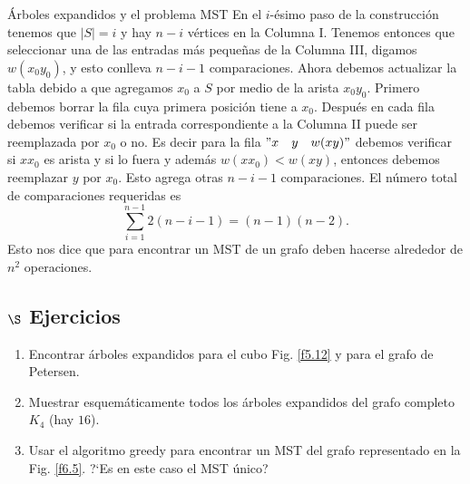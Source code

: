 \begin{section}{Árboles expandidos y el problema MST}
En el $i$-ésimo paso de la construcción tenemos que $|S|=i$ y hay
$n-i$ vértices en la Columna I. Tenemos entonces que seleccionar
una de las entradas más pequeñas de la Columna III, digamos
$w(x_0y_0)$, y esto conlleva $n-i-1$ comparaciones. Ahora debemos
actualizar la tabla debido a que agregamos $x_0$ a $S$ por medio
de la arista $x_0y_0$. Primero debemos borrar la fila cuya primera
posición tiene a $x_0$. Después en cada fila debemos verificar si
la entrada correspondiente a la Columna II puede ser reemplazada
por $x_0$ o no. Es decir para la fila $"x\quad y \quad w(xy)"$
debemos verificar si $xx_0$ es arista y si lo fuera y
además $w(xx_0) < w(xy)$, entonces debemos reemplazar $y$ por
$x_0$. Esto agrega otras $n-i-1$ comparaciones. El número total de
comparaciones requeridas es
$$
\sum_{i=1}^{n-1} 2(n-i-1) = (n-1)(n-2).
$$
Esto nos dice que para encontrar un MST de un grafo deben hacerse
alrededor de $n^2$ operaciones.


\subsection*{\Large $\S$ Ejercicios}
\begin{enumerate}[1)]
	\item Encontrar árboles expandidos para el cubo Fig. \ref{f5.12} y
	para el grafo de Petersen.
	\item Muestrar esquemáticamente todos los árboles expandidos del grafo
	completo $K_4$ (hay $16$).	
\item Usar el algoritmo greedy para encontrar un MST del grafo
representado en la Fig. \ref{f6.5}. ?`Es en este caso el MST único?


\end{enumerate}
\end{section}
